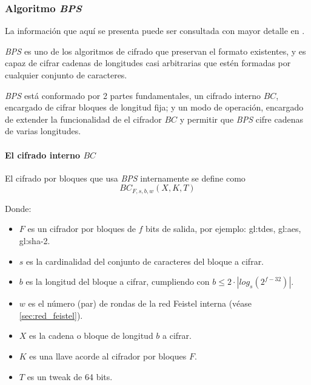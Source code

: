 %
%

\subsubsection{Algoritmo \textit{BPS}}

La información que aquí se presenta puede ser consultada con mayor detalle en
\cite{bps}.

\textit{BPS} es uno de los algoritmos de cifrado que preservan el formato
existentes, y es capaz de cifrar cadenas de longitudes casi arbitrarias que
estén formadas por cualquier conjunto de caracteres.

\textit{BPS} está conformado por 2 partes fundamentales, un cifrado interno
$BC$, encargado de cifrar bloques de longitud fija; y un modo de operación,
encargado de extender la funcionalidad de el cifrador $BC$ y permitir que
\textit{BPS} cifre cadenas de varias longitudes.


\paragraph{El cifrado interno $BC$}


El cifrado por bloques que usa \textit{BPS} internamente se define como
\begin{equation}
  BC_{F,s,b,w}(X,K,T)
\end{equation}

Donde:
\begin{itemize}
  \item $F$ es un cifrador por bloques de $f$ bits de salida,
    por ejemplo: \gls{gl:tdes}, \gls{gl:aes}, \gls{gl:sha}-2.
  \item $s$ es la cardinalidad del conjunto de caracteres del bloque a cifrar.
  \item $b$ es la longitud del bloque a cifrar,
    cumpliendo con $b \leq 2 \cdot |log_s(2^{f-32})|$.
  \item $w$ es el número (par) de rondas de la red Feistel interna
    (véase \ref{sec:red_feistel}).
  \item $X$ es la cadena o bloque de longitud $b$ a cifrar.
  \item $K$ es una llave acorde al cifrador por bloques $F$.
  \item $T$ es un tweak de 64 bits.
\end{itemize}

